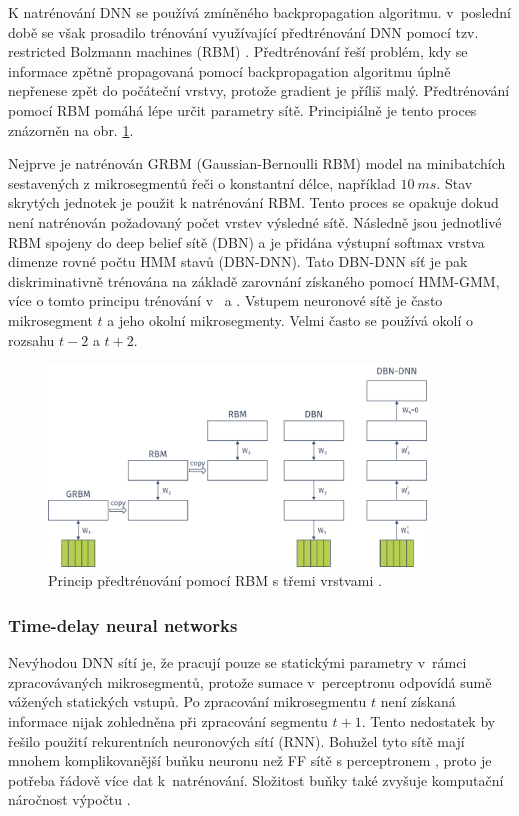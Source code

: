 K natrénování DNN se používá zmíněného backpropagation algoritmu. v~poslední době se však prosadilo trénování využívající předtrénování DNN pomocí tzv. restricted Bolzmann machines (RBM) \cite{Hinton2012}. Předtrénování řeší problém, kdy se informace zpětně propagovaná pomocí backpropagation algoritmu úplně nepřenese zpět do počáteční vrstvy, protože gradient je příliš malý. Předtrénování pomocí RBM pomáhá lépe určit parametry sítě. Principiálně je tento proces znázorněn na obr. \ref{fig:asr:acoustic:dnn:pretraining}.

Nejprve je natrénován GRBM (Gaussian-Bernoulli RBM) model na minibatchích sestavených z mikrosegmentů řeči o konstantní délce, například $10\ ms$. Stav skrytých jednotek je použit k natrénování RBM. Tento proces se opakuje dokud není natrénován požadovaný počet vrstev výsledné sítě. Následně jsou jednotlivé RBM spojeny do deep belief sítě (DBN) a je přidána výstupní softmax vrstva dimenze rovné počtu HMM stavů (DBN-DNN). Tato DBN-DNN síť je pak diskriminativně trénována na základě zarovnání získaného pomocí HMM-GMM, více o tomto principu trénování v~\cite{Hinton2012} a \cite{Vesely2013}. Vstupem neuronové sítě je často mikrosegment $t$ a jeho okolní mikrosegmenty. Velmi často se používá okolí o rozsahu $t-2$ a $t+2$.

\begin{figure}[hbpt]
  \centering
  \includegraphics[width=0.9\textwidth]{./ch4-asr/img/pretraining.pdf}
  \caption[Princip předtrénování pomocí RBM.]{Princip předtrénování pomocí RBM s třemi vrstvami \cite{Hinton2012}.}
  \label{fig:asr:acoustic:dnn:pretraining}
\end{figure}

\subsubsection{Time-delay neural networks}

Nevýhodou DNN sítí je, že pracují pouze se statickými parametry v~rámci zpracovávaných mikrosegmentů, protože sumace v~perceptronu odpovídá sumě vážených statických vstupů. Po zpracování mikrosegmentu $t$ není získaná informace nijak zohledněna při zpracování segmentu $t+1$. Tento nedostatek by řešilo použití rekurentních neuronových sítí (RNN). Bohužel tyto sítě mají mnohem komplikovanější buňku neuronu než FF sítě s perceptronem \cite{Amodei2016}, proto je potřeba řádově více dat k~natrénování. Složitost buňky také zvyšuje komputační náročnost výpočtu \cite{Hannun2014}.

